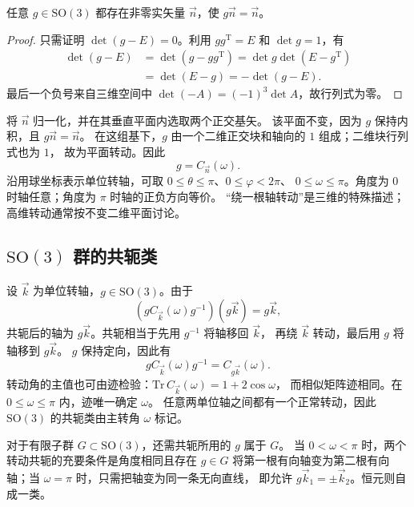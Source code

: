 \begin{theorem}[三维转动轴的存在]
任意 $g\in\mathrm{SO}\left(3\right)$ 都存在非零实矢量 $\vec n$，使 $g\vec n=\vec n$。
\end{theorem}
\begin{proof}
只需证明 $\det\left(g-E\right)=0$。利用 $gg^{\mathrm{T}}=E$ 和 $\det g=1$，有
\begin{align}
\det\left(g-E\right)&=\det\left(g-gg^{\mathrm{T}}\right)
=\det g\det\left(E-g^{\mathrm{T}}\right)\\
&=\det\left(E-g\right)=-\det\left(g-E\right).
\end{align}
最后一个负号来自三维空间中 $\det\left(-A\right)=\left(-1\right)^3\det A$，故行列式为零。
\end{proof}
将 $\vec n$ 归一化，并在其垂直平面内选取两个正交基矢。
该平面不变，因为 $g$ 保持内积，且 $g\vec n=\vec n$。
在这组基下，$g$ 由一个二维正交块和轴向的 $1$ 组成；二维块行列式也为 $1$，
故为平面转动。因此
\begin{equation}
g=C_{\vec n}\left(\omega\right).
\end{equation}
沿用球坐标表示单位转轴，可取 $0\leqslant\theta\leqslant\pi$、$0\leqslant\varphi<2\pi$、
$0\leqslant\omega\leqslant\pi$。角度为 $0$ 时轴任意；角度为 $\pi$ 时轴的正负方向等价。
“绕一根轴转动”是三维的特殊描述；高维转动通常按不变二维平面讨论。

\subsection{\texorpdfstring{$\mathrm{SO}\left(3\right)$ 群的共轭类}{SO(3) 群的共轭类}}
设 $\vec k$ 为单位转轴，$g\in\mathrm{SO}\left(3\right)$。由于
\begin{equation}
\left(gC_{\vec k}\left(\omega\right)g^{-1}\right)\left(g\vec k\right)=g\vec k,
\end{equation}
共轭后的轴为 $g\vec k$。共轭相当于先用 $g^{-1}$ 将轴移回 $\vec k$，
再绕 $\vec k$ 转动，最后用 $g$ 将轴移到 $g\vec k$。
$g$ 保持定向，因此有
\begin{equation}
gC_{\vec k}\left(\omega\right)g^{-1}=C_{g\vec k}\left(\omega\right).
\end{equation}
转动角的主值也可由迹检验：$\mathrm{Tr}\,C_{\vec k}\left(\omega\right)=1+2\cos\omega$，
而相似矩阵迹相同。在 $0\leqslant\omega\leqslant\pi$ 内，迹唯一确定 $\omega$。
任意两单位轴之间都有一个正常转动，因此 $\mathrm{SO}\left(3\right)$ 的共轭类由主转角 $\omega$ 标记。

对于有限子群 $G\subset\mathrm{SO}\left(3\right)$，还需共轭所用的 $g$ 属于 $G$。
当 $0<\omega<\pi$ 时，两个转动共轭的充要条件是角度相同且存在 $g\in G$
将第一根有向轴变为第二根有向轴；当 $\omega=\pi$ 时，只需把轴变为同一条无向直线，
即允许 $g\vec k_1=\pm\vec k_2$。恒元则自成一类。

